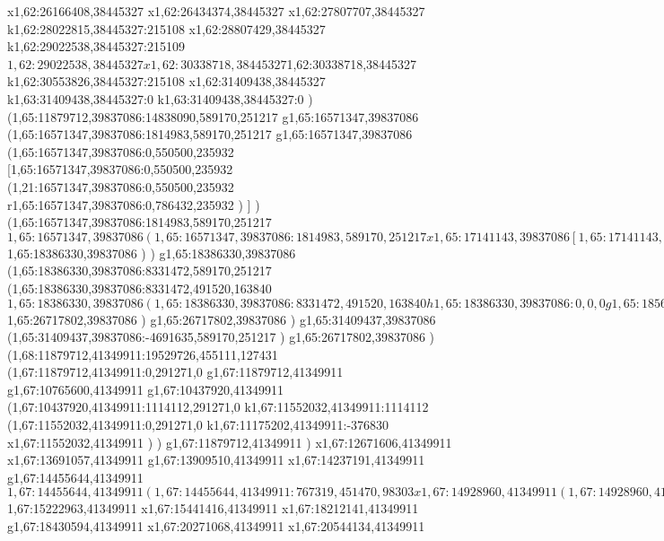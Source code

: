 {x1,62:26166408,38445327
x1,62:26434374,38445327
x1,62:27807707,38445327
k1,62:28022815,38445327:215108
x1,62:28807429,38445327
k1,62:29022538,38445327:215109
$1,62:29022538,38445327
x1,62:30338718,38445327
$1,62:30338718,38445327
k1,62:30553826,38445327:215108
x1,62:31409438,38445327
k1,63:31409438,38445327:0
k1,63:31409438,38445327:0
)
(1,65:11879712,39837086:14838090,589170,251217
g1,65:16571347,39837086
(1,65:16571347,39837086:1814983,589170,251217
g1,65:16571347,39837086
(1,65:16571347,39837086:0,550500,235932
[1,65:16571347,39837086:0,550500,235932
(1,21:16571347,39837086:0,550500,235932
r1,65:16571347,39837086:0,786432,235932
)
]
)
(1,65:16571347,39837086:1814983,589170,251217
$1,65:16571347,39837086
(1,65:16571347,39837086:1814983,589170,251217
x1,65:17141143,39837086
[1,65:17141143,39999102:498803,751186,89201
(1,65:17141143,39566493:485582,318577,0
x1,65:17379349,39566493
x1,65:17593957,39566493
)
(1,65:17141143,39999102:498803,318577,89201
x1,65:17607178,39999102
)
]
x1,65:18386330,39837086
)
$1,65:18386330,39837086
)
)
g1,65:18386330,39837086
(1,65:18386330,39837086:8331472,589170,251217
(1,65:18386330,39837086:8331472,491520,163840
$1,65:18386330,39837086
(1,65:18386330,39837086:8331472,491520,163840
h1,65:18386330,39837086:0,0,0
g1,65:18568370,39837086
x1,65:19260141,39837086
g1,65:19442181,39837086
x1,65:20503498,39837086
g1,65:20649130,39837086
x1,65:21158856,39837086
g1,65:21304488,39837086
x1,65:21595759,39837086
x1,65:22294128,39837086
g1,65:22949489,39837086
g1,65:23058713,39837086
x1,65:23295371,39837086
g1,65:23477411,39837086
x1,65:23914319,39837086
g1,65:24096359,39837086
x1,65:25698354,39837086
g1,65:25807578,39837086
x1,65:26717802,39837086
)
$1,65:26717802,39837086
)
g1,65:26717802,39837086
)
g1,65:31409437,39837086
(1,65:31409437,39837086:-4691635,589170,251217
)
g1,65:26717802,39837086
)
(1,68:11879712,41349911:19529726,455111,127431
(1,67:11879712,41349911:0,291271,0
g1,67:11879712,41349911
g1,67:10765600,41349911
g1,67:10437920,41349911
(1,67:10437920,41349911:1114112,291271,0
k1,67:11552032,41349911:1114112
(1,67:11552032,41349911:0,291271,0
k1,67:11175202,41349911:-376830
x1,67:11552032,41349911
)
)
g1,67:11879712,41349911
)
x1,67:12671606,41349911
x1,67:13691057,41349911
g1,67:13909510,41349911
x1,67:14237191,41349911
g1,67:14455644,41349911
$1,67:14455644,41349911
(1,67:14455644,41349911:767319,451470,98303
x1,67:14928960,41349911
(1,67:14928960,41448214:294003,295640,0
x1,67:15190195,41448214
)
)
$1,67:15222963,41349911
x1,67:15441416,41349911
x1,67:18212141,41349911
g1,67:18430594,41349911
x1,67:20271068,41349911
x1,67:20544134,41349911
}
